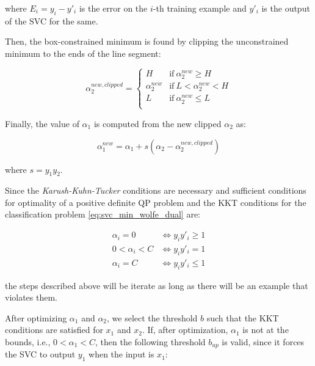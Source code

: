 where $E_i = y_i - y'_i$ is the error on the $i$-th training example and $y'_i$ is the output of the SVC for the same.

Then, the box-constrained minimum is found by clipping the unconstrained minimum to the ends of the line segment:

\begin{equation} \label{eq:smo_svc_a2_new_clipped}
    \alpha_2^{new,clipped} =
        \begin{cases}
            H & \text{if} \ \alpha_2^{new} \geq H \\
            \alpha_2^{new} & \text{if} \ L < \alpha_2^{new} < H \\
            L & \text{if} \ \alpha_2^{new} \leq L \\
        \end{cases}
\end{equation}

Finally, the value of $\alpha_1$ is computed from the new clipped $\alpha_2$ as:

\begin{equation} \label{eq:smo_svc_a1_new}
	\alpha_1^{new} = \alpha_1 + s (\alpha_2 - \alpha_2^{new,clipped})
\end{equation}

where $s = y_1 y_2$.

Since the \emph{Karush-Kuhn-Tucker} conditions are necessary and sufficient conditions for optimality of a positive definite QP problem and the KKT conditions for the classification problem \eqref{eq:svc_min_wolfe_dual} are:

\begin{equation} \label{eq:svc_smo_kkt}
	\begin{aligned}
		\alpha_i = 0 & \Leftrightarrow y_i y'_i \geq 1 \\
		0 < \alpha_i < C & \Leftrightarrow y_i y'_i = 1 \\
		\alpha_i = C & \Leftrightarrow y_i y'_i \leq 1
	\end{aligned}
\end{equation}

the steps described above will be iterate as long as there will be an example that violates them.

After optimizing $\alpha_1$ and $\alpha_2$, we select the threshold $b$ such that the KKT conditions are satisfied for $x_1$ and $x_2$. If, after optimization, $\alpha_1$ is not at the bounds, i.e., $0 < \alpha_1 < C$, then the following threshold $b_{up}$ is valid, since it forces the SVC to output $y_1$ when the input is $x_1$:

